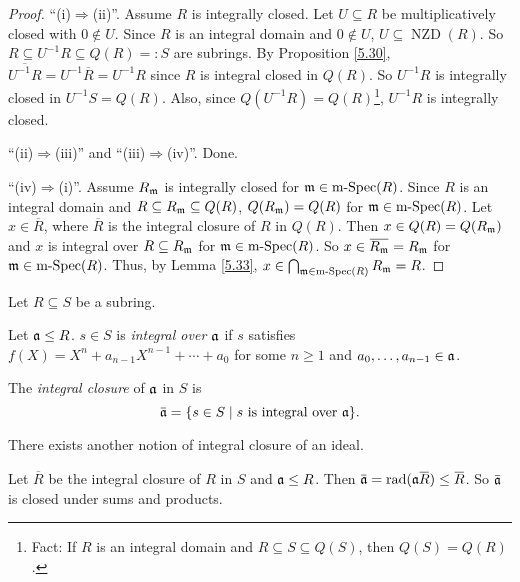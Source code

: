 \begin{proof}
    ``(i)$\Rightarrow$(ii)''. Assume $R$ is integrally closed. Let $U \subseteq R$ be multiplicatively closed with $0 \not \in U$. Since $R$ is an integral domain and $0 \not\in U$, $U \subseteq \operatorname{NZD}(R)$. So $R \subseteq U^{-1}R \subseteq Q(R) =: S$ are subrings. By Proposition \ref{5.30}, $\overbar{U^{-1}R} = U^{-1} \overbar{R} = U^{-1}R$ since $R$ is integral closed in $Q(R)$. So $U^{-1}R$ is integrally closed in $U^{-1}S = Q(R)$. Also, since $Q(U^{-1}R) = Q(R)$\footnote[2]{Fact: If $R$ is an integral domain and $R \subseteq S \subseteq Q(S)$, then $Q(S) = Q(R)$.}, $U^{-1}R$ is integrally closed. \par 
    ``(ii)$\Rightarrow$(iii)'' and ``(iii)$\Rightarrow$(iv)''. Done. \par
    ``(iv)$\Rightarrow$(i)''. Assume $R_{\mathfrak{m}}$ is integrally closed for $\mathfrak{m} \in \operatorname{m-Spec}(R)$. Since $R$ is an integral domain and $R \subseteq R_{\mathfrak{m}} \subseteq Q(R)$, $Q(R_{\mathfrak{m}}) = Q(R)$ for $\mathfrak{m} \in \operatorname{m-Spec}(R)$. Let $x \in \overbar{R}$, where $\overbar{R}$ is the integral closure of $R$ in $Q(R)$. Then $x \in Q(R) = Q(R_{\mathfrak{m}})$ and $x$ is integral over $R \subseteq R_{\mathfrak{m}}$ for $\mathfrak{m} \in \operatorname{m-Spec}(R)$. So $x \in \overbar{R_\ffm} = R_\ffm$ for $\mathfrak{m} \in \operatorname{m-Spec}(R)$. Thus, by Lemma \ref{5.33}, $x \in \bigcap_{\mathfrak{m} \in \operatorname{m-Spec}(R)}R_{\mathfrak{m}} = R$. 
\end{proof}

\noindent Let $R \subseteq S$ be a subring.

\begin{definition}\label{5.35}
    Let $\mathfrak{a} \leq R$. $s \in S$ is \emph{integral over $\mathfrak{a}$} if $s$ satisfies $f(X) = X^{n} + a_{n-1}X^{n-1} + \cdots + a_0$ for some $n \geq 1$ and $a_0,\ldots,a_{n-1} \in \mathfrak{a}$. \par 
    The \emph{integral closure} of $\mathfrak{a}$ in $S$ is 
    \[\overbar{\ffa} = \{s \in S \mid s \text{ is integral over $\ffa$}\}.\]
\end{definition}

\begin{warning}\label{5.36}
    There exists another notion of integral closure of an ideal.
\end{warning}

\begin{lemma}\label{5.37}
    Let $\overbar{R}$ be the integral closure of $R$ in $S$ and $\mathfrak{a} \leq R$. Then $\overbar{\ffa} = \operatorname{rad}(\ffa \overbar{R}) \leq \overbar{R}$. So $\overbar{\ffa}$ is closed under sums and products.
\end{lemma}

